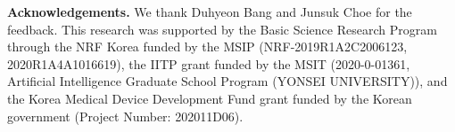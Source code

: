 \documentclass[final]{cvpr}
\begin{document}
\noindent\textbf{Acknowledgements. }
We thank Duhyeon Bang and Junsuk Choe for the feedback. This research was supported by the Basic Science Research Program through the NRF Korea funded by the MSIP (NRF-2019R1A2C2006123, 2020R1A4A1016619), the IITP grant funded by the MSIT (2020-0-01361, Artificial Intelligence Graduate School Program (YONSEI UNIVERSITY)), and the Korea Medical Device Development Fund grant funded by the Korean government (Project Number:  202011D06).



{\small


}
\end{document}
